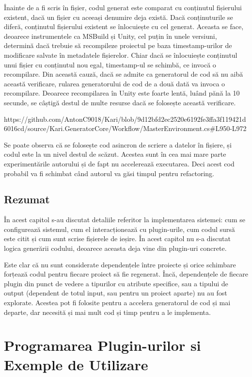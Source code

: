 \documentclass{report}
\begin{document}
Înainte de a fi scris în fișier, codul generat este comparat cu conținutul fișierului existent, dacă un fișier cu aceeași denumire deja există.
Dacă conținuturile se diferă, conținutul fișierului existent se înlocuiește cu cel generat.
Aceasta se face, deoarece instrumentele ca MSBuild și Unity, cel puțin în unele versiuni, determină dacă trebuie să recompileze proiectul pe baza timestamp-urilor de modificare salvate în metadatele fișierelor.
Chiar dacă se înlocuiește conținutul unui fișier cu conținutul nou egal, timestamp-ul se schimbă, ce invocă o recompilare.
Din această cauză, dacă se admite ca generatorul de cod să nu aibă această verificare, rularea generatorului de cod de a două dată va invoca o recompilare.
Deoarece recompilarea în Unity este foarte lentă, luând pănă la 10 secunde, se câștigă destul de multe resurse dacă se folosește această verificare.

https://github.com/AntonC9018/Kari/blob/9d12bfd2ec2520e6192fe3ffa3f119421d6016cd/source/Kari.GeneratorCore/Workflow/MasterEnvironment.cs#L950-L972

Se poate observa că se folosește cod asincron de scriere a datelor în fișiere, și codul este la un nivel destul de scăzut.
Acestea sunt în cea mai mare parte experimentările autorului și de fapt nu accelerează executarea.
Deci acest cod probabil va fi schimbat când autorul va găsi timpul pentru refactoring.

\section{Rezumat}

În acest capitol s-au discutat detaliile referitor la implementarea sistemei: cum se configurează sistemul, cum el interacționează cu plugin-urile, cum codul sursă este citit și cum sunt scrise fișierele de ieșire.
În acest capitol nu s-a discutat logica generării codului, deoarece aceasta deja vine din plugin-uri concrete.

Este clar că nu sunt considerate dependențele între proiecte și orice schimbare forțează codul pentru fiecare proiect să fie regenerat.
Încă, dependențele de fiecare plugin din punct de vedere a tipurilor cu atribute specifice, sau a tipului de output (dependent de totul input, sau pentru un proiect aparte) nu au fost explorate.
Acestea pot fi folosite pentru a accelera generatorul de cod și mai departe, dar necesită și mai mult cod și timp pentru a le implementa.

\chapter{Programarea Plugin-urilor si Exemple de Utilizare}
\end{document}
